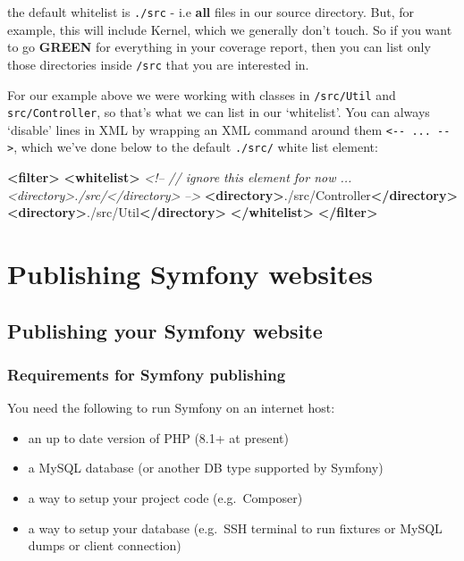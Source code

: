 \documentclass[a4paperpaper,openright]{book}
\newenvironment{Shaded}{}{}
\newcommand{\CommentTok}[1]{\textcolor[rgb]{0.38,0.63,0.69}{\textit{#1}}}
\newcommand{\KeywordTok}[1]{\textcolor[rgb]{0.00,0.44,0.13}{\textbf{#1}}}
\newcommand{\NormalTok}[1]{#1}
\begin{document}
the default whitelist is \texttt{./src} - i.e \textbf{all} files in our
source directory. But, for example, this will include Kernel, which we
generally don't touch. So if you want to go \textbf{GREEN} for
everything in your coverage report, then you can list only those
directories inside \texttt{/src} that you are interested in.

For our example above we were working with classes in \texttt{/src/Util}
and \texttt{src/Controller}, so that's what we can list in our
`whitelist'. You can always `disable' lines in XML by wrapping an XML
command around them \texttt{\textless{}-\/-\ ...\ -\/-\textgreater{}},
which we've done below to the default \texttt{./src/} white list
element:

\begin{Shaded}
\begin{Highlighting}[]
    \KeywordTok{<filter>}
        \KeywordTok{<whitelist>}
            \CommentTok{<!--}
\CommentTok{                // ignore this element for now ...}
\CommentTok{                <directory>./src/</directory>}
\CommentTok{            -->}
            \KeywordTok{<directory>}\NormalTok{./src/Controller}\KeywordTok{</directory>}
            \KeywordTok{<directory>}\NormalTok{./src/Util}\KeywordTok{</directory>}
        \KeywordTok{</whitelist>}
    \KeywordTok{</filter>}
\end{Highlighting}
\end{Shaded}

\part{Publishing Symfony websites}

\hypertarget{publishing-your-symfony-website}{%
\chapter{Publishing your Symfony
website}\label{publishing-your-symfony-website}}

\hypertarget{requirements-for-symfony-publishing}{%
\section{Requirements for Symfony
publishing}\label{requirements-for-symfony-publishing}}

You need the following to run Symfony on an internet host:

\begin{itemize}
\item
  an up to date version of PHP (8.1+ at present)
\item
  a MySQL database (or another DB type supported by Symfony)
\item
  a way to setup your project code (e.g.~Composer)
\item
  a way to setup your database (e.g.~SSH terminal to run fixtures or
  MySQL dumps or client connection)
\end{itemize}
\end{document}
